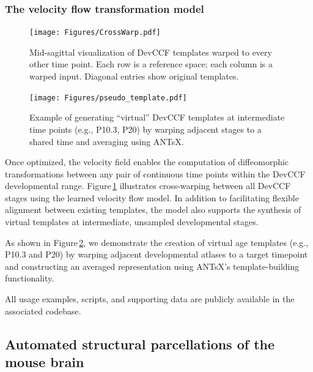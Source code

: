 \documentclass[
  12pt,
]{article}
\begin{document}
\subsubsection{The velocity flow transformation
model}\label{the-velocity-flow-transformation-model}

\begin{figure}[!htb]
\centering
\texttt{[image: Figures/CrossWarp.pdf]}
\caption{Mid-sagittal visualization of DevCCF templates warped to every other time point. Each row is a reference space; each column is a warped input. Diagonal entries show original templates.}
\label{fig:crosswarp}
\end{figure}

\begin{figure}[!htb]
\centering
\texttt{[image: Figures/pseudo\_template.pdf]}
\caption{Example of generating “virtual” DevCCF templates at intermediate time points (e.g., P10.3, P20) by warping adjacent stages to a shared time and averaging using ANTsX.}
\label{fig:virtual}
\end{figure}

Once optimized, the velocity field enables the computation of
diffeomorphic transformations between any pair of continuous time points
within the DevCCF developmental range. Figure\,\ref{fig:crosswarp}
illustrates cross-warping between all DevCCF stages using the learned
velocity flow model. In addition to facilitating flexible alignment
between existing templates, the model also supports the synthesis of
virtual templates at intermediate, unsampled developmental stages.

As shown in Figure\,\ref{fig:virtual}, we demonstrate the creation of
virtual age templates (e.g., P10.3 and P20) by warping adjacent
developmental atlases to a target timepoint and constructing an averaged
representation using ANTsX's template-building functionality.

All usage examples, scripts, and supporting data are publicly available
in the associated codebase.

\subsection{Automated structural parcellations of the mouse
brain}\label{automated-structural-parcellations-of-the-mouse-brain}
\end{document}
